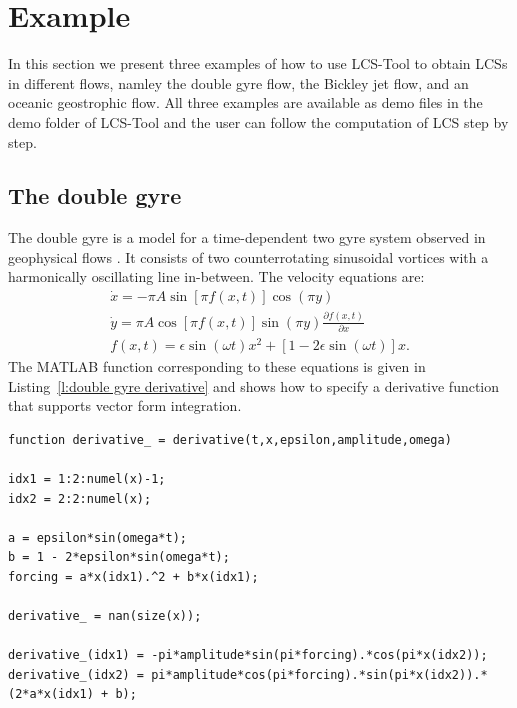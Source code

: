 \documentclass{article}
\begin{document}
\clearpage

\section{Example}
In this section we present three examples of how to use LCS-Tool to obtain LCSs in different flows, namley the double gyre flow, the Bickley jet flow, and an oceanic geostrophic flow. All three examples are available as demo files in the demo folder of LCS-Tool and the user can follow the computation of LCS step by step.

\subsection{The double gyre}
The double gyre is a model for a time-dependent two gyre system observed in geophysical flows \parencite{shadden05:_defin_lagran_lyapun}. It consists of two counterrotating sinusoidal vortices with a harmonically oscillating line in-between. The velocity equations are:
\begin{equation}
\begin{split}
\dot x = -\pi A \sin[\pi f(x,t)] \cos(\pi y)\\
\dot y = \pi A \cos[\pi f(x,t)] \sin(\pi y) \frac{\partial f(x,t)}{\partial x}\\
f(x,t) = \epsilon \sin(\omega t) x^2 + [1 - 2 \epsilon \sin(\omega t)] x.
\end{split}
\label{eq:double gyre derivative equations}
\end{equation}
The MATLAB function corresponding to these equations is given in Listing~\ref{l:double gyre derivative} and shows how to specify a derivative function that supports vector form integration.

\begin{lstlisting}[caption={Double gyre derivative function corresponding to Equations~\ref{eq:double gyre derivative equations}.},label=l:double gyre derivative]
function derivative_ = derivative(t,x,epsilon,amplitude,omega)

idx1 = 1:2:numel(x)-1;
idx2 = 2:2:numel(x);

a = epsilon*sin(omega*t);
b = 1 - 2*epsilon*sin(omega*t);
forcing = a*x(idx1).^2 + b*x(idx1);

derivative_ = nan(size(x));

derivative_(idx1) = -pi*amplitude*sin(pi*forcing).*cos(pi*x(idx2));
derivative_(idx2) = pi*amplitude*cos(pi*forcing).*sin(pi*x(idx2)).*(2*a*x(idx1) + b);
\end{lstlisting}
\end{document}
